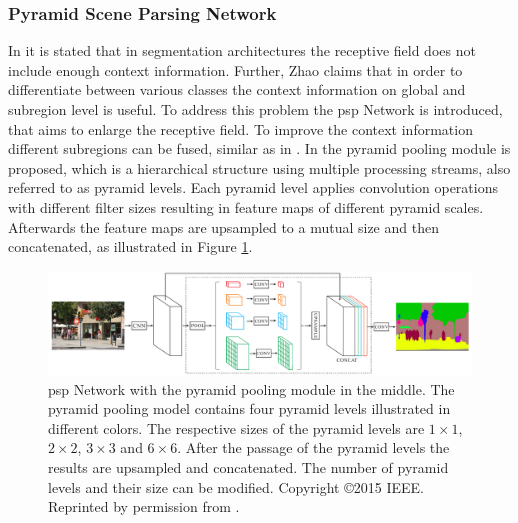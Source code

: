 \subsubsection{Pyramid Scene Parsing Network}
In \cite{Zhao17-PSP} it is stated that in segmentation architectures the receptive field does not include enough context information.
Further, Zhao claims that in order to differentiate between various classes the context information on global and subregion level is useful.
To address this problem the \gls{psp} Network is introduced, that aims to enlarge the receptive field.
To improve the context information different subregions can be fused, similar as in \cite{He15-SPP}.
In \cite{Zhao17-PSP} the pyramid pooling module is proposed, which is a hierarchical structure using multiple processing streams, also referred to as pyramid levels.
Each pyramid level applies convolution operations with different filter sizes resulting in feature maps of different pyramid scales.
Afterwards the feature maps are upsampled to a mutual size and then concatenated, as illustrated in Figure \ref{fig:ch2:sec2:psp}.
\begin{figure}
	\includegraphics[width=\linewidth]{figures/chap223_psp.png}
	\caption[Pyramid Scene Parsing Network]{
		\gls{psp} Network with the pyramid pooling module in the middle.
		The pyramid pooling model contains four pyramid levels illustrated in different colors.
		The respective sizes of the pyramid levels are $1 \times 1$, $2 \times 2$, $3 \times 3$ and  $6 \times 6$.
		After the passage of the pyramid levels the results are upsampled and concatenated.
		The number of pyramid levels and their size can be modified.
		Copyright \copyright 2015 IEEE. Reprinted by permission from \cite{Zhao17-PSP}.}
	\label{fig:ch2:sec2:psp}
\end{figure}



